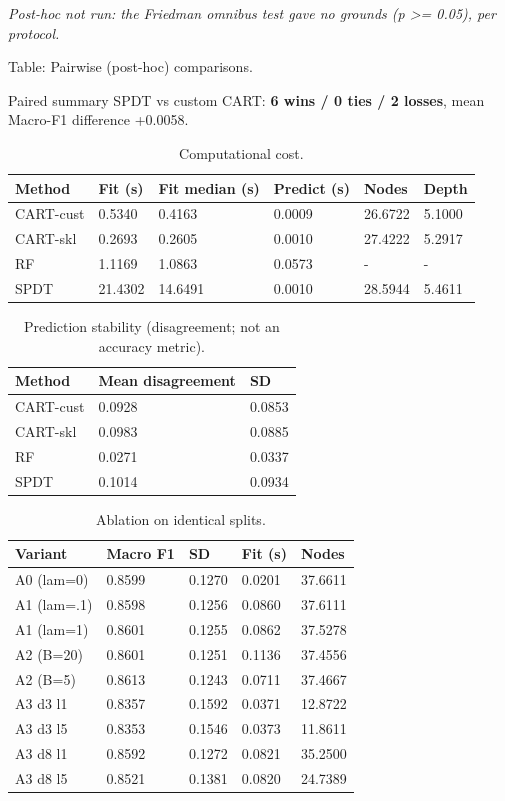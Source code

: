 \documentclass[
  conference]{IEEEtran}
\begin{document}
\emph{Post-hoc not run: the Friedman omnibus test gave no grounds (p
\textgreater= 0.05), per protocol.}

Table: Pairwise (post-hoc) comparisons.

Paired summary SPDT vs custom CART: \textbf{6 wins / 0 ties / 2 losses},
mean Macro-F1 difference +0.0058.

\begin{table}[!t]
\centering
\caption{Computational cost.}
\begin{tabular}{@{}llllll@{}}
\toprule\noalign{}
Method & Fit (s) & Fit median (s) & Predict (s) & Nodes & Depth \\
\midrule\noalign{}
\bottomrule\noalign{}
CART-cust & 0.5340 & 0.4163 & 0.0009 & 26.6722 & 5.1000 \\
CART-skl & 0.2693 & 0.2605 & 0.0010 & 27.4222 & 5.2917 \\
RF & 1.1169 & 1.0863 & 0.0573 & - & - \\
SPDT & 21.4302 & 14.6491 & 0.0010 & 28.5944 & 5.4611 \\
\end{tabular}
\end{table}

\begin{table}[!tb]
\centering
\caption{Prediction stability (disagreement; not an accuracy metric).}
\begin{tabular}{@{}lll@{}}
\toprule\noalign{}
Method & Mean disagreement & SD \\
\midrule\noalign{}
\bottomrule\noalign{}
CART-cust & 0.0928 & 0.0853 \\
CART-skl & 0.0983 & 0.0885 \\
RF & 0.0271 & 0.0337 \\
SPDT & 0.1014 & 0.0934 \\
\end{tabular}
\end{table}

\begin{table}[!tb]
\centering
\caption{Ablation on identical splits.}
\begin{tabular}{@{}lllll@{}}
\toprule\noalign{}
Variant & Macro F1 & SD & Fit (s) & Nodes \\
\midrule\noalign{}
\bottomrule\noalign{}
A0 (lam=0) & 0.8599 & 0.1270 & 0.0201 & 37.6611 \\
A1 (lam=.1) & 0.8598 & 0.1256 & 0.0860 & 37.6111 \\
A1 (lam=1) & 0.8601 & 0.1255 & 0.0862 & 37.5278 \\
A2 (B=20) & 0.8601 & 0.1251 & 0.1136 & 37.4556 \\
A2 (B=5) & 0.8613 & 0.1243 & 0.0711 & 37.4667 \\
A3 d3 l1 & 0.8357 & 0.1592 & 0.0371 & 12.8722 \\
A3 d3 l5 & 0.8353 & 0.1546 & 0.0373 & 11.8611 \\
A3 d8 l1 & 0.8592 & 0.1272 & 0.0821 & 35.2500 \\
A3 d8 l5 & 0.8521 & 0.1381 & 0.0820 & 24.7389 \\
\end{tabular}
\end{table}
\end{document}
